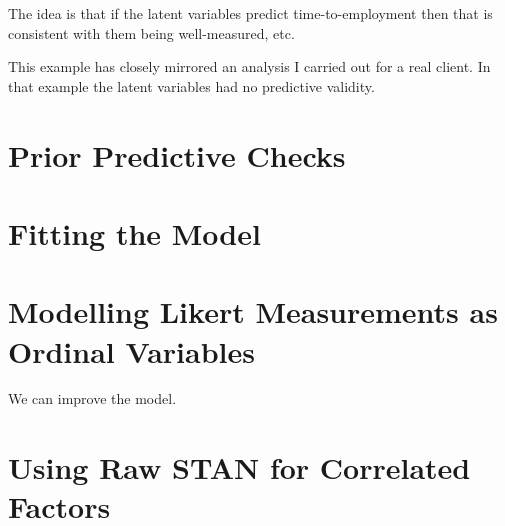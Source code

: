 \documentclass[
  letterpaper,
  DIV=11,
  numbers=noendperiod]{scrreprt}
\begin{document}
The idea is that if the latent variables predict time-to-employment then
that is consistent with them being well-measured, etc.

This example has closely mirrored an analysis I carried out for a real
client. In that example the latent variables had no predictive validity.

\hypertarget{prior-predictive-checks}{%
\section{Prior Predictive Checks}\label{prior-predictive-checks}}

\hypertarget{fitting-the-model}{%
\section{Fitting the Model}\label{fitting-the-model}}

\hypertarget{modelling-likert-measurements-as-ordinal-variables}{%
\section{Modelling Likert Measurements as Ordinal
Variables}\label{modelling-likert-measurements-as-ordinal-variables}}

We can improve the model.

\hypertarget{using-raw-stan-for-correlated-factors}{%
\section*{Using Raw STAN for Correlated
Factors}\label{using-raw-stan-for-correlated-factors}}
\end{document}
